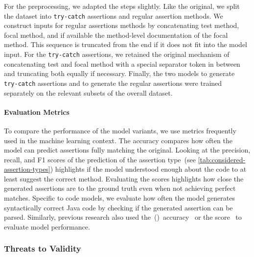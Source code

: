 For the \togaast preprocessing, we adapted the \toga steps slightly.
Like the original, we split the dataset into \texttt{try-catch}
assertions and regular assertion methods.
We construct inputs for regular assertions methods by concatenating
test method, focal method, and if available the method-level
documentation of the focal method. This sequence is truncated from the
end if it does not fit into the model input.
For the \texttt{try-catch} assertions, we retained the original
mechanism of concatenating test and focal method with a special
separator token in between and truncating both equally if necessary.
Finally, the two models to generate \texttt{try-catch} assertions and
to generate the regular assertions were trained separately on the
relevant subsets of the overall dataset.


\paragraph{Evaluation Metrics}

To compare the performance of the model variants, we use metrics
frequently used in the machine learning context.
The  accuracy compares how often the model can predict
assertions fully matching the original. Looking at the precision,
recall, and F1 scores of the prediction of the assertion type~(see
\cref{tab:considered-assertion-types}) highlights if the model
understood enough about the code to at least suggest the correct
method.
Evaluating the \bleu scores highlights how close the generated
assertions are to the ground truth even when not achieving perfect
matches.
Specific to code models, we evaluate how often the model generates
syntactically correct Java code by checking if the generated assertion
can be parsed.
Similarly, previous research also used
the~\mbox{()}~accuracy~\cite{Watson2020,Dinella2022,Tufano2022}
or the \bleu score~\cite{Tufano2022} to evaluate model performance.




\subsubsection{Threats to Validity}

